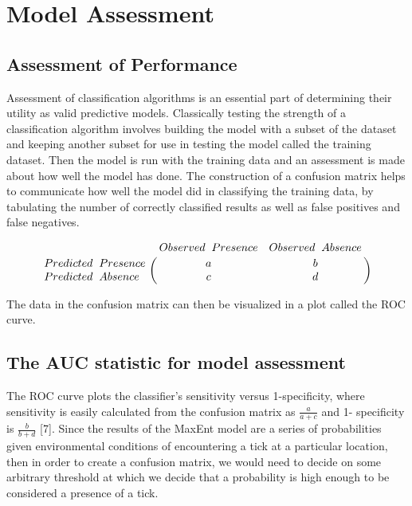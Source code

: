 

\section{Model Assessment }  %

\subsection{Assessment of Performance }

Assessment of classification algorithms is an essential part of determining their utility as valid predictive models. Classically testing the strength of a classification algorithm involves building the model with a subset of the dataset and keeping another subset for use in testing the model called the training dataset. Then the model is run with the training data and an assessment is made about how well the model has done. The construction of a confusion matrix helps to communicate how well the model did in classifying the training data, by tabulating the number of correctly classified results as well as false positives and false negatives. 

\begin{equation} \bordermatrix{~ & Observed \hspace{0.2cm} Presence & Observed \hspace{0.2cm} Absence \cr
                  Predicted\hspace{0.2cm}  Presence & a & b \cr
                  Predicted \hspace{0.2cm} Absence & c & d \cr} \end{equation}
                  
\noindent The data in the confusion matrix can then be visualized in a plot called the ROC curve. \newline

\subsection{The AUC statistic for model assessment }

The ROC curve plots the classifier's sensitivity versus 1-specificity, where sensitivity is easily calculated from the confusion matrix as  $\frac{a}{a+c}$ and 1- specificity is $\frac{b}{b+d}$ [7]. Since the results of the MaxEnt model are a series of probabilities given environmental conditions of encountering a tick at a particular location, then in order to create a confusion matrix, we would need to decide on some arbitrary threshold at which we decide that a probability is high enough to be considered a presence of a tick. \newline

